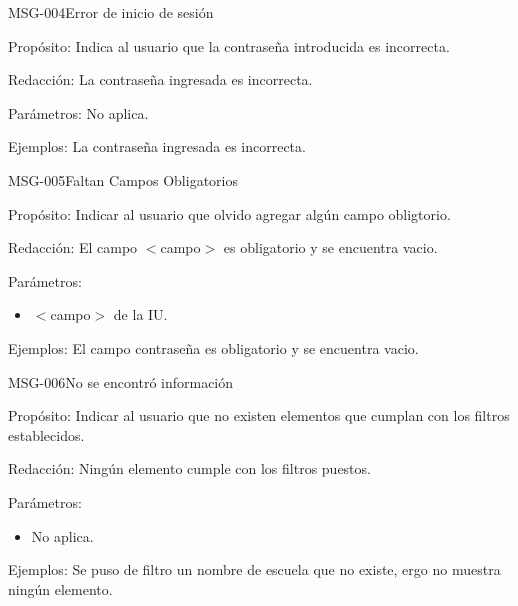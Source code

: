 \begin{cdtMessage}[msgErrorColor]{MSG-004}{Error de inicio de sesión}
	\item[Propósito:] Indica al usuario que la contraseña introducida es incorrecta.
	\item[Redacción:] La contraseña ingresada es incorrecta.
	\item[Parámetros:] No aplica.
	\item[Ejemplos:] La contraseña ingresada es incorrecta.
\end{cdtMessage}

\begin{cdtMessage}[msgErrorColor]{MSG-005}{Faltan Campos Obligatorios} 
	\item[Propósito:] Indicar al usuario que olvido agregar algún campo obligtorio.
	\item[Redacción:] El campo $<$campo$>$ es obligatorio y se encuentra vacio.
	\item[Parámetros:] \hspace{1cm}
	\begin{itemize}
		\item $<$campo$>$ de la IU.
	\end{itemize}
	\item[Ejemplos:] El campo contraseña es obligatorio y se encuentra vacio.
\end{cdtMessage}


\begin{cdtMessage}[msgInfoColor]{MSG-006}{No se encontró información} 
	\item[Propósito:] Indicar al usuario que no existen elementos que cumplan con los filtros establecidos.
	\item[Redacción:] Ningún elemento cumple con los filtros puestos.
	\item[Parámetros:] \hspace{1cm}
	\begin{itemize}
		\item No aplica.
	\end{itemize}
	\item[Ejemplos:] Se puso de filtro un nombre de escuela que no existe, ergo no muestra ningún elemento.
\end{cdtMessage}

